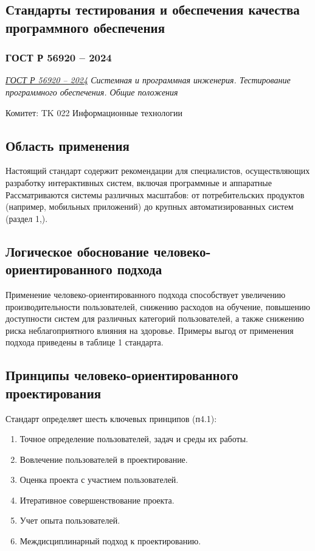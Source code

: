 \subsection{Стандарты тестирования и обеспечения качества программного обеспечения}

\subsubsection{ГОСТ Р 56920 -- 2024}

\emph{\href{https://allgosts.ru/35/080/gost_r_56920-2024.pdf}{ГОСТ Р 56920 -- 2024}
Системная и программная инженерия. Тестирование программного обеспечения. Общие положения
}

\par
Комитет: TK 022 Информационные технологии

\subsection*{Область применения}
Настоящий стандарт содержит рекомендации для специалистов, осуществляющих разработку интерактивных систем, включая программные и аппаратные
Рассматриваются системы различных масштабов: от потребительских продуктов (например, мобильных приложений) до крупных автоматизированных систем (раздел 1,).

\subsection*{Логическое обоснование человеко-ориентированного подхода}
Применение человеко-ориентированного подхода способствует увеличению производительности пользователей, снижению расходов
на обучение, повышению доступности систем для различных категорий пользователей, а также снижению риска неблагоприятного влияния на здоровье.
Примеры выгод от применения подхода приведены в таблице 1 стандарта.

\subsection*{Принципы человеко-ориентированного проектирования}
Стандарт определяет шесть ключевых принципов (п4.1):
\begin{enumerate}
    \item Точное определение пользователей, задач и среды их работы.
    \item Вовлечение пользователей в проектирование.
    \item Оценка проекта с участием пользователей.
    \item Итеративное совершенствование проекта.
    \item Учет опыта пользователей.
    \item Междисциплинарный подход к проектированию.
\end{enumerate}

